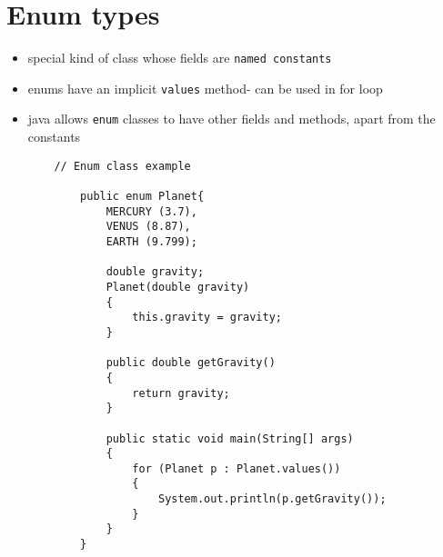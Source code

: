 \documentclass{article}
\begin{document}
\section{Enum types}
\begin{itemize}
    \item special kind of class whose fields are \texttt{named constants}
    \item enums have an implicit \texttt{values} method- can be used in for loop
    \item java allows \texttt{enum} classes to have other fields and methods, apart from the constants
    \begin{lstlisting}
    // Enum class example
    
        public enum Planet{
            MERCURY (3.7),
            VENUS (8.87),
            EARTH (9.799);
            
            double gravity;
            Planet(double gravity)
            {
                this.gravity = gravity;
            }
            
            public double getGravity()
            {
                return gravity;
            }
            
            public static void main(String[] args) 
            {
                for (Planet p : Planet.values())
                {
                    System.out.println(p.getGravity());
                }
            }
        }
    \end{lstlisting}
\end{itemize}
\end{document}

